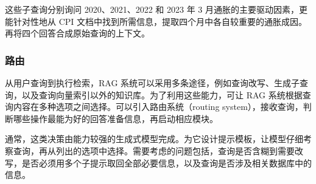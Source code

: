 这些子查询分别询问 2020、2021、2022 和 2023 年 3 月通胀的主要驱动因素，更能针对性地从 CPI 文档中找到所需信息，提取四个月中各自较重要的通胀成因。再将四个回答合成原始查询的上下文。

\subsubsection{路由}
\label{sec:ch07-routing}
从用户查询到执行检索，RAG 系统可以采用多条途径，例如查询改写、生成子查询，以及查询向量索引以外的知识库。为了利用这些能力，可让 RAG 系统根据查询内容在多种选项之间选择。可以引入路由系统（routing system），接收查询，判断哪些操作最能为好的回答准备信息，再启动相应模块。

通常，这类决策由能力较强的生成式模型完成。为它设计提示模板，让模型仔细考察查询，再从列出的选项中选择。需要考虑的问题包括，查询是否含糊到需要改写，是否必须用多个子提示取回全部必要信息，以及查询是否涉及相关数据库中的信息。
